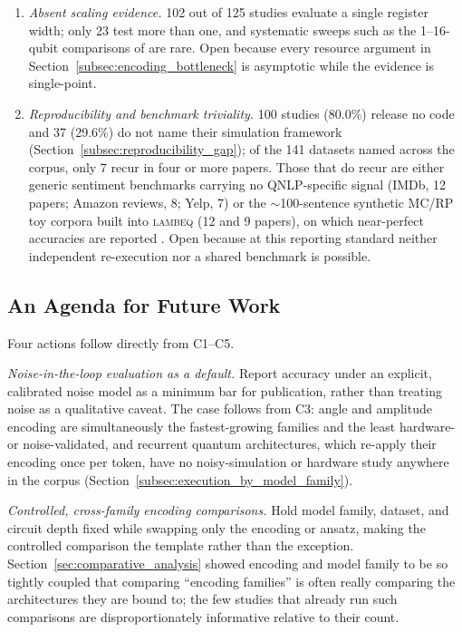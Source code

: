 \documentclass{ieeeaccess}
\begin{document}
\begin{enumerate}
\item[C4)] \emph{Absent scaling evidence.} 102 out of 125 studies evaluate a single register width; only 23 test more than one, and systematic sweeps such as the 1--16-qubit comparisons of \cite{zhang_entangled_2024,kim_quantum_2025} are rare. Open because every resource argument in Section~\ref{subsec:encoding_bottleneck} is asymptotic while the evidence is single-point.

\item[C5)] \emph{Reproducibility and benchmark triviality.} 100 studies (80.0\%) release no code and 37 (29.6\%) do not name their simulation framework (Section~\ref{subsec:reproducibility_gap}); of the 141 datasets named across the corpus, only 7 recur in four or more papers. Those that do recur are either generic sentiment benchmarks carrying no QNLP-specific signal (IMDb, 12 papers; Amazon reviews, 8; Yelp, 7) or the $\sim$100-sentence synthetic MC/RP toy corpora built into \textsc{lambeq} (12 and 9 papers), on which near-perfect accuracies are reported \cite{lorenz_qnlp_2023,bouakba_ensemble_2023,liu_research_2024}. Open because at this reporting standard neither independent re-execution nor a shared benchmark is possible.
\end{enumerate}

\subsection{An Agenda for Future Work}
\label{subsec:future_agenda}

Four actions follow directly from C1--C5.

\emph{Noise-in-the-loop evaluation as a default.} Report accuracy under an explicit, calibrated noise model as a minimum bar for publication, rather than treating noise as a qualitative caveat. The case follows from C3: angle and amplitude encoding are simultaneously the fastest-growing families and the least hardware- or noise-validated, and recurrent quantum architectures, which re-apply their encoding once per token, have no noisy-simulation or hardware study anywhere in the corpus (Section~\ref{subsec:execution_by_model_family}).

\emph{Controlled, cross-family encoding comparisons.} Hold model family, dataset, and circuit depth fixed while swapping only the encoding or ansatz, making the controlled comparison the template rather than the exception. Section~\ref{sec:comparative_analysis} showed encoding and model family to be so tightly coupled that comparing ``encoding families'' is often really comparing the architectures they are bound to; the few studies that already run such comparisons are disproportionately informative relative to their count.
\end{document}
